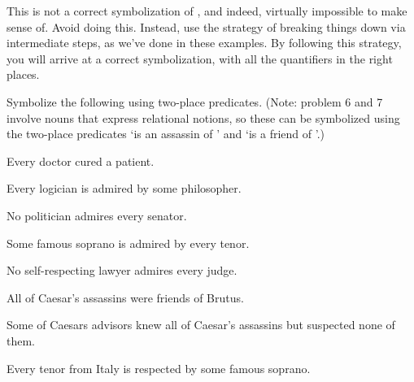 This is not a correct symbolization of , and indeed, virtually impossible to make sense of.  Avoid doing this.  Instead, use the strategy of breaking things down via intermediate steps, as we've done in these examples.  By following this strategy, you will arrive at a correct symbolization, with all the quantifiers in the right places.

\practiceproblems

\problempart Symbolize the following using two-place predicates.  (Note: problem 6 and 7 involve nouns that express relational notions, so these can be symbolized using the two-place predicates `\blank is an assassin of \blank' and `\blank is a friend of \blank'.)

\begin{earg}

\item Every doctor cured a patient.

\item Every logician is admired by some philosopher.

\item No  politician admires every senator.

\item Some famous soprano is admired by every tenor.  

\item No self-respecting lawyer admires every judge.

\item All of Caesar's assassins were friends of Brutus.

\item Some of Caesars advisors knew all of Caesar's assassins but suspected none of them.

\item Every tenor from Italy is respected by some famous soprano.


\end{earg}



